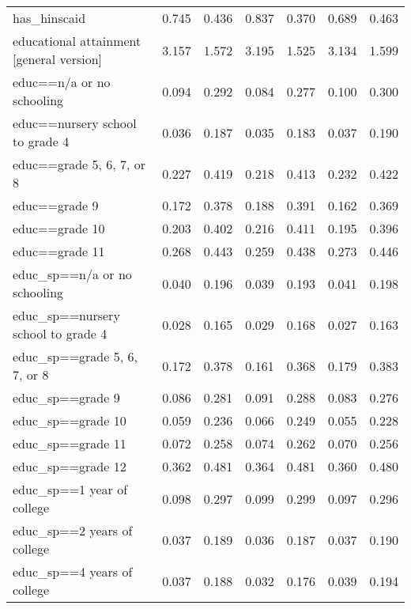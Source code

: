 \begin{table}[htbp]
\begin{tabular}{l*{3}{cc}}
has\_hinscaid        &       0.745&       0.436&       0.837&       0.370&       0.689&       0.463\\
educational attainment [general version]&       3.157&       1.572&       3.195&       1.525&       3.134&       1.599\\
educ==n/a or no schooling&       0.094&       0.292&       0.084&       0.277&       0.100&       0.300\\
educ==nursery school to grade 4&       0.036&       0.187&       0.035&       0.183&       0.037&       0.190\\
educ==grade 5, 6, 7, or 8&       0.227&       0.419&       0.218&       0.413&       0.232&       0.422\\
educ==grade 9       &       0.172&       0.378&       0.188&       0.391&       0.162&       0.369\\
educ==grade 10      &       0.203&       0.402&       0.216&       0.411&       0.195&       0.396\\
educ==grade 11      &       0.268&       0.443&       0.259&       0.438&       0.273&       0.446\\
educ\_sp==n/a or no schooling&       0.040&       0.196&       0.039&       0.193&       0.041&       0.198\\
educ\_sp==nursery school to grade 4&       0.028&       0.165&       0.029&       0.168&       0.027&       0.163\\
educ\_sp==grade 5, 6, 7, or 8&       0.172&       0.378&       0.161&       0.368&       0.179&       0.383\\
educ\_sp==grade 9    &       0.086&       0.281&       0.091&       0.288&       0.083&       0.276\\
educ\_sp==grade 10   &       0.059&       0.236&       0.066&       0.249&       0.055&       0.228\\
educ\_sp==grade 11   &       0.072&       0.258&       0.074&       0.262&       0.070&       0.256\\
educ\_sp==grade 12   &       0.362&       0.481&       0.364&       0.481&       0.360&       0.480\\
educ\_sp==1 year of college&       0.098&       0.297&       0.099&       0.299&       0.097&       0.296\\
educ\_sp==2 years of college&       0.037&       0.189&       0.036&       0.187&       0.037&       0.190\\
educ\_sp==4 years of college&       0.037&       0.188&       0.032&       0.176&       0.039&       0.194\\

\end{tabular}
\end{table}
